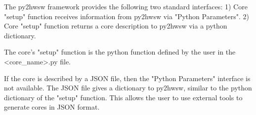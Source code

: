 %

The py2hwsw framework provides the following two standard interfaces:
1) Core "setup" function receives information from py2hwsw via "Python Parameters".
2) Core "setup" function returns a core description to py2hwsw via a python dictionary.

The core's "setup" function is the python function defined by the user in the <core\_name>.py file.

If the core is described by a JSON file, then the "Python Parameters" interface is not available.
The JSON file gives a dictionary to py2hwsw, similar to the python dictionary of the "setup" function.
This allows the user to use external tools to generate cores in JSON format.


